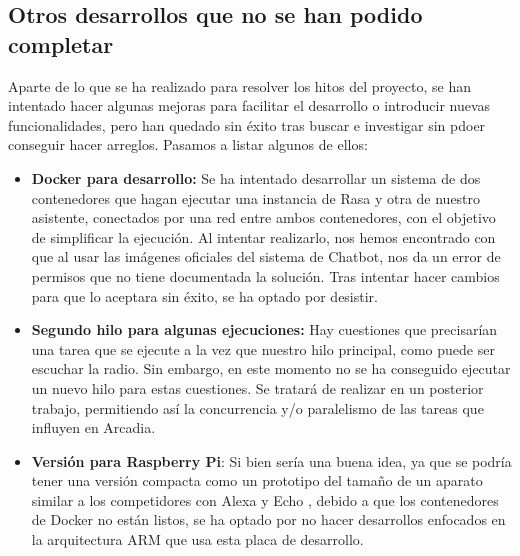 \subsection{Otros desarrollos que no se han podido completar}
\label{sect:unfinished-dev}
Aparte de lo que se ha realizado para resolver los hitos del proyecto, se han intentado hacer algunas mejoras para facilitar el desarrollo o introducir nuevas funcionalidades, pero han quedado sin éxito tras buscar e investigar sin pdoer conseguir hacer arreglos. Pasamos a listar algunos de ellos:
\begin{itemize}
	\item \textbf{Docker para desarrollo:} Se ha intentado desarrollar un sistema de dos contenedores que hagan ejecutar una instancia de Rasa y otra de nuestro asistente, conectados por una red entre ambos contenedores, con el objetivo de simplificar la ejecución. Al intentar realizarlo, nos hemos encontrado con que al usar las imágenes oficiales del sistema de Chatbot, nos da un error de permisos que no tiene documentada la solución. Tras intentar hacer cambios para que lo aceptara sin éxito, se ha optado por desistir.
	\item \textbf{Segundo hilo para algunas ejecuciones:} Hay cuestiones que precisarían una tarea que se ejecute a la vez que nuestro hilo principal, como puede ser escuchar la radio. Sin embargo, en este momento no se ha conseguido ejecutar un nuevo hilo para estas cuestiones. Se tratará de realizar en un posterior trabajo, permitiendo así la concurrencia y/o paralelismo de las tareas que influyen en Arcadia.
	\item \textbf{Versión para Raspberry Pi}: Si bien sería una buena idea, ya que se podría tener una versión compacta como un prototipo del tamaño de un aparato similar a los competidores con Alexa \cite{alexa} y Echo \cite{echo}, debido a que los contenedores de Docker no están listos, se ha optado por no hacer desarrollos enfocados en la arquitectura ARM que usa esta placa de desarrollo.
\end{itemize}

